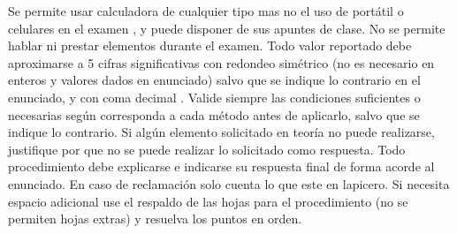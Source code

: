 \documentclass[12pt]{article}
\begin{document}
{\scriptsize
Se permite usar calculadora de cualquier tipo mas no el uso de portátil o celulares en el examen%
, y puede disponer de sus apuntes de clase. %
No se permite hablar ni prestar elementos durante el examen. %
Todo valor reportado debe aproximarse a 5 cifras significativas con redondeo simétrico (no es necesario en enteros y valores dados en enunciado) salvo que se indique lo contrario en el enunciado, y con coma decimal%
.
Valide siempre las condiciones suficientes o necesarias según corresponda a cada método antes de aplicarlo, salvo que se indique lo contrario. Si algún elemento solicitado en teoría no puede realizarse, justifique por que no se puede realizar lo solicitado como respuesta. Todo procedimiento debe explicarse e indicarse su respuesta final de forma acorde al enunciado. %
En caso de reclamación solo cuenta lo que este en lapicero. %
Si necesita espacio adicional %
use el respaldo de las hojas para el procedimiento (no se permiten hojas extras) y resuelva los puntos en orden. %

}

\end{document}
